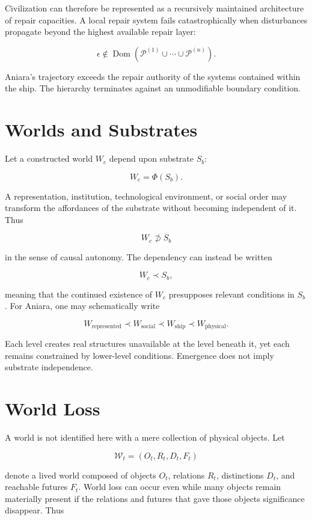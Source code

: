 \documentclass[11pt,oneside]{book}
\theoremstyle{definition}
\theoremstyle{remark}
\begin{document}
Civilization can therefore be represented as a recursively maintained architecture of repair
capacities. A local repair system fails catastrophically when disturbances propagate beyond the
highest available repair layer:

\[
\epsilon \notin \operatorname{Dom} \left( \mathcal{P}^{(1)} \cup\cdots\cup \mathcal{P}^{(n)} \right).
\]

Aniara's trajectory exceeds the repair authority of the systems contained within the ship. The
hierarchy terminates against an unmodifiable boundary condition.

\section{Worlds and Substrates}

Let a constructed world \(W_c\) depend upon substrate \(S_b\):

\[
W_c=\Phi(S_b).
\]

A representation, institution, technological environment, or social order may transform the
affordances of the substrate without becoming independent of it. Thus

\[
W_c\not\supset S_b
\]

in the sense of causal autonomy. The dependency can instead be written

\[
W_c\prec S_b,
\]

meaning that the continued existence of \(W_c\) presupposes relevant conditions in \(S_b\). For
Aniara, one may schematically write

\[
W_{\mathrm{represented}} \prec W_{\mathrm{social}} \prec W_{\mathrm{ship}} \prec W_{\mathrm{physical}}.
\]

Each level creates real structures unavailable at the level beneath it, yet each remains constrained
by lower-level conditions. Emergence does not imply substrate independence.

\section{World Loss}

A world is not identified here with a mere collection of physical objects. Let

\[
\mathcal{W}_t = (O_t,R_t,D_t,F_t)
\]

denote a lived world composed of objects \(O_t\), relations \(R_t\), distinctions \(D_t\), and
reachable futures \(F_t\). World loss can occur even while many objects remain materially present if
the relations and futures that gave those objects significance disappear. Thus
\end{document}
